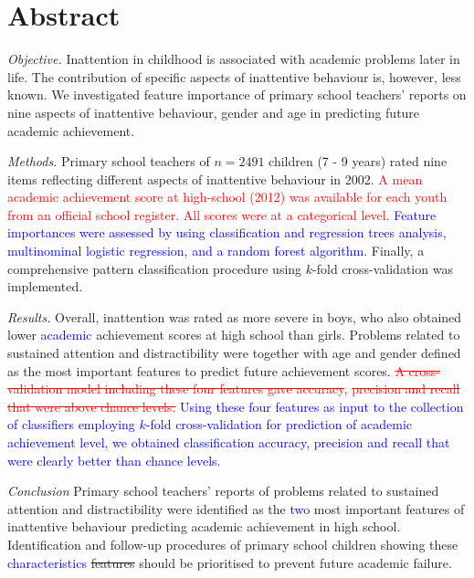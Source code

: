 \documentclass[10pt,letterpaper]{article}
\begin{document}
\section*{Abstract}
\noindent \emph{Objective.}
Inattention in childhood is associated with academic problems later in life. The contribution of specific aspects of inattentive behaviour is, however, less known. We investigated feature importance of primary school teachers' reports on nine aspects of inattentive behaviour, gender and age in predicting future academic achievement. 

\noindent \emph{Methods.} Primary school teachers of $n=2491$ children (7 - 9 years) rated nine items reflecting different aspects of inattentive behaviour in 2002. \textcolor{red}{A mean academic achievement score at high-school (2012) was available for each youth from an official school register. All scores were at a categorical level.} \textcolor{blue}{Feature importances were assessed by using  classification and regression trees analysis, multinominal logistic regression, and a random forest algorithm}. Finally, a comprehensive pattern classification procedure using $k$-fold cross-validation was implemented.

\noindent \emph{Results.}
Overall, inattention was rated as more severe in boys, who also obtained lower \textcolor{blue}{academic} achievement scores at high school than girls. Problems related to sustained attention and distractibility were together with age and gender defined as the most important features to predict future achievement scores. 
\textcolor{red}{\sout{A cross-validation model including these four features gave accuracy}, \sout{precision and recall that were above chance levels.} } 
\textcolor{blue}{Using these four features as input to the collection of  classifiers
employing $k$-fold cross-validation for prediction of academic achievement level, we obtained classification accuracy, precision and recall that were clearly better than chance levels. }

\noindent \emph{Conclusion} 
Primary school teachers' reports of problems related to sustained attention and distractibility were identified as the \textcolor{blue}{two} most important features of inattentive behaviour predicting academic achievement in high school.  Identification and follow-up procedures of primary school children showing these \textcolor{blue}{characteristics} \sout{features} should be prioritised to prevent future academic failure. %
\end{document}
